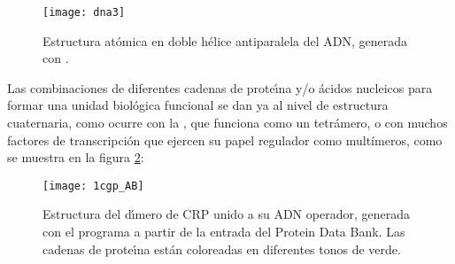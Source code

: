 
\begin{figure}
\begin{center} 
\texttt{[image: dna3]}
\caption%
{
Estructura at\'{o}mica en doble h\'{e}lice antiparalela del ADN, generada con . 
}
\label{fig:dna3}
\end{center}
\end{figure}

%

Las combinaciones de diferentes cadenas de prote\'\i{}na y/o \'{a}cidos nucleicos para formar una unidad biol\'{o}gica 
funcional se dan ya al nivel de estructura cuaternaria, como ocurre con la 
, que funciona como un tetr\'{a}mero, o 
con muchos factores de transcripci\'{o}n que ejercen su papel regulador como mult\'{i}meros, como se muestra en la figura \ref{fig:1cgp}:

\begin{figure}
\begin{center} 
\texttt{[image: 1cgp\_AB]}
\caption%
{
Estructura del d\'\i{}mero de CRP unido a su ADN operador, generada con el programa
 a partir de la entrada 
del Protein Data Bank. Las cadenas de prote\'\i{}na est\'{a}n coloreadas en diferentes tonos de verde.
}
\label{fig:1cgp}
\end{center}
\end{figure}

